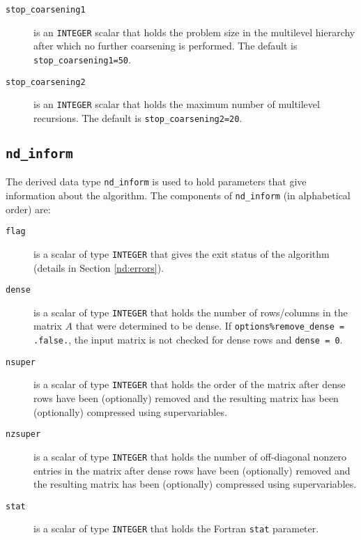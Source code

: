 \begin{description}
\item[\texttt{stop\_coarsening1}] is an {\tt INTEGER} scalar that holds the problem size in the multilevel hierarchy after which no further coarsening is performed.
The default is {\tt stop\_coarsening1=50}.

\item[\texttt{stop\_coarsening2}] is an {\tt INTEGER} scalar that holds the maximum number
of multilevel recursions.  
The default is {\tt stop\_coarsening2=20}.

\end{description}




\subsection{\texttt{nd\_inform}}
\label{nd:type:inform}
The derived data type {\tt nd\_inform}
is used to hold parameters that give information about the algorithm. The 
components of {\tt nd\_inform}
(in alphabetical order) are:

\begin{description}

\item[\texttt{flag}] is a scalar of type  {\tt INTEGER}
that gives the exit status of the algorithm (details in Section \ref{nd:errors}).

\item[\texttt{dense}] is a scalar of type {\tt INTEGER} that holds 
the number of rows/columns in the matrix $A$ that were determined to be dense. 
If {\tt options\%remove\_dense = .false.}, the input matrix is not checked for 
dense rows and {\tt dense = 0}.

\item[\texttt{nsuper}] is a scalar of type {\tt INTEGER} that holds the order 
of the matrix after dense rows have been (optionally) removed and 
the resulting matrix has been (optionally) compressed using supervariables. 

\item[\texttt{nzsuper}] is a scalar of type {\tt INTEGER} that holds the number of 
off-diagonal nonzero entries in the matrix after dense rows have been 
(optionally) removed and the resulting matrix has been (optionally) compressed 
using supervariables. 

\item[\texttt{stat}] is a scalar of type  {\tt INTEGER}
that holds the Fortran {\tt stat} parameter. 


\end{description}



